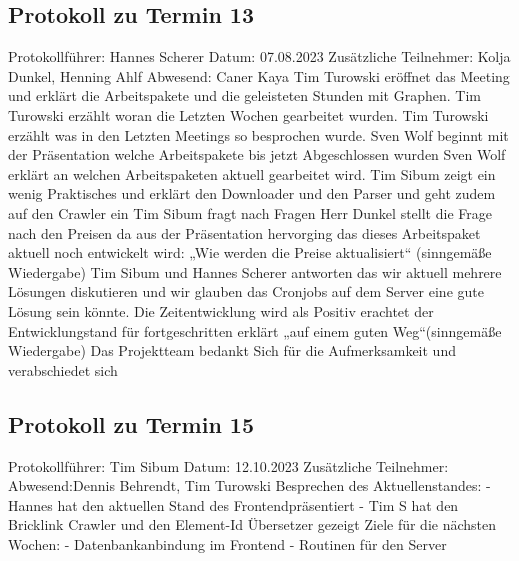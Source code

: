 \subsection{Protokoll zu Termin 13}
Protokollführer: Hannes Scherer \newline
Datum: 07.08.2023 \newline
Zusätzliche Teilnehmer: Kolja Dunkel, Henning Ahlf  \newline
Abwesend: Caner Kaya \newline \newline
Tim Turowski eröffnet das Meeting und erklärt die Arbeitspakete und die geleisteten Stunden mit Graphen. 
Tim Turowski erzählt woran die Letzten Wochen gearbeitet wurden.
Tim Turowski erzählt was in den Letzten Meetings so besprochen wurde.
Sven Wolf beginnt mit der Präsentation welche Arbeitspakete bis jetzt Abgeschlossen wurden
Sven Wolf erklärt an welchen Arbeitspaketen aktuell gearbeitet wird. 
Tim Sibum zeigt ein wenig Praktisches und erklärt den Downloader und den Parser und geht zudem auf den Crawler ein
Tim Sibum fragt nach Fragen
Herr Dunkel stellt die Frage nach den Preisen da aus der Präsentation hervorging das dieses Arbeitspaket aktuell noch entwickelt wird: „Wie werden die Preise aktualisiert“ (sinngemäße Wiedergabe) 
Tim Sibum und Hannes Scherer antworten das wir aktuell mehrere Lösungen diskutieren und wir glauben das Cronjobs auf dem Server eine gute Lösung sein könnte.
Die Zeitentwicklung wird als Positiv erachtet der Entwicklungstand für fortgeschritten erklärt „auf einem guten Weg“(sinngemäße Wiedergabe)
Das Projektteam bedankt Sich für die Aufmerksamkeit und verabschiedet sich
\subsection{Protokoll zu Termin 15}
Protokollführer: Tim Sibum \newline
Datum: 12.10.2023 \newline
Zusätzliche Teilnehmer:\newline
Abwesend:Dennis Behrendt, Tim Turowski \newline \newline
Besprechen des Aktuellenstandes:\newline
- Hannes hat den aktuellen Stand des Frontendpräsentiert\newline
- Tim S hat den Bricklink Crawler und den Element-Id Übersetzer gezeigt\newline
Ziele für die nächsten Wochen:\newline
- Datenbankanbindung im Frontend\newline
- Routinen für den Server\newline
\newpage
